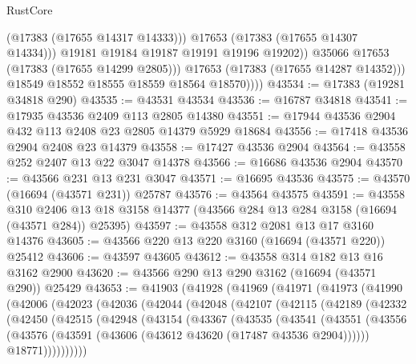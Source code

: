 \begin{lexlean}{RustCore}
\begin{coremodule}
                        (@17383 (@17655 @14317 @14333)))
                      @17653
                      (@17383 (@17655 @14307 @14334)))
                    @19181
                    @19184
                    @19187
                    @19191
                    @19196
                    @19202))
                @35066
                @17653
                (@17383 (@17655 @14299 @2805)))
              @17653
              (@17383 (@17655 @14287 @14352)))
            @18549
            @18552
            @18555
            @18559
            @18564
            @18570))))
@43534 := @17383 (@19281 @34818 @290)
@43535 := @43531 @43534
@43536 := @16787 @34818
@43541 := @17935 @43536 @2409 @113 @2805 @14380
@43551 := @17944 @43536 @2904 @432 @113 @2408 @23 @2805 @14379 @5929 @18684
@43556 := @17418 @43536 @2904 @2408 @23 @14379
@43558 := @17427 @43536 @2904
@43564 := @43558 @252 @2407 @13 @22 @3047 @14378
@43566 := @16686 @43536 @2904
@43570 := @43566 @231 @13 @231 @3047
@43571 := @16695 @43536
@43575 := @43570 (@16694 (@43571 @231)) @25787
@43576 := @43564 @43575
@43591 := @43558
    @310
    @2406
    @13
    @18
    @3158
    @14377
    (@43566 @284 @13 @284 @3158 (@16694 (@43571 @284)) @25395)
@43597 := @43558 @312 @2081 @13 @17 @3160 @14376
@43605 := @43566 @220 @13 @220 @3160 (@16694 (@43571 @220)) @25412
@43606 := @43597 @43605
@43612 := @43558 @314 @182 @13 @16 @3162 @2900
@43620 := @43566 @290 @13 @290 @3162 (@16694 (@43571 @290)) @25429
@43653 := @41903
    (@41928
      (@41969
        (@41971
          (@41973
            (@41990
              (@42006
                (@42023
                  (@42036
                    (@42044
                      (@42048
                        (@42107
                          (@42115
                            (@42189
                              (@42332
                                (@42450
                                  (@42515
                                    (@42948
                                      (@43154
                                        (@43367
                                          (@43535
                                            (@43541
                                              (@43551
                                                (@43556
                                                  (@43576
                                                    (@43591
                                                      (@43606
                                                        (@43612 @43620 (@17487 @43536 @2904))))))
                                                @18771))))))))))

\end{coremodule}
\end{lexlean}

